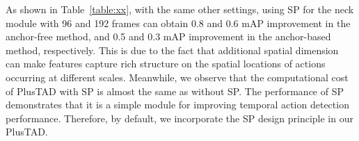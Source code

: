 \documentclass[a4paper,fleqn]{cas-dc}
\begin{document}
As shown in Table~\ref{table:xx}, with the same other settings, using SP for the neck module with 96 and 192 frames can obtain 0.8 and 0.6 mAP improvement in the anchor-free method, and 0.5 and 0.3 mAP improvement in the anchor-based method, respectively. 
This is due to the fact that additional spatial dimension can make features capture rich structure on the spatial locations of actions occurring at different scales. Meanwhile, we observe that the computational cost of PlusTAD with SP is almost the same as without SP. The performance of SP demonstrates that it is a simple module for improving temporal action detection performance. Therefore, by default, we incorporate the SP design principle in our PlusTAD.

\begin{table*}[t]
\centering
\small
\caption{\textbf{Comparison of the different spatial sizes in the training stage on THUMOS14~\citep{THUMOS14}}.
Original size means input frame size, and the crop size indicates the cropped patch resolution as the network input. 
}
\label{table:BasicTAD Plus-origin-spatial-size}
\setlength\tabcolsep{2.65mm}
\end{table*}
\end{document}
